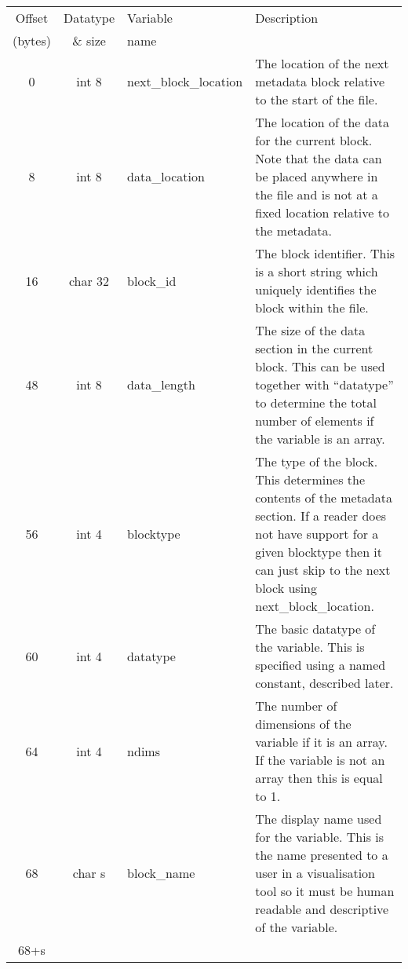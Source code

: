 \documentclass[12pt]{article}
\begin{document}
\begin{center}
\begin{tabularx}{0.9\textwidth}[!hbt]{cclX}
  Offset & Datatype & Variable & Description\\
  (bytes) & \& size & name &
  \\\toprule

  0 & int 8 & next\_block\_location & The location of the next metadata
  block relative to the start of the file.
  \\\midrule

  8 & int 8 & data\_location & The location of the data for the current block.
  Note that the data can be placed anywhere in the file and is not at a fixed
  location relative to the metadata.
  \\\midrule

  16 & char 32 & block\_id & The block identifier. This is a short string
  which uniquely identifies the block within the file.
  \\\midrule

  48 & int 8 & data\_length & The size of the data section in the current block.
  This can be used together with ``datatype'' to determine the total number
  of elements if the variable is an array.
  \\\midrule

  56 & int 4 & blocktype & The type of the block. This determines the contents
  of the metadata section. If a reader does not have support for a given
  blocktype then it can just skip to the next block using next\_block\_location.
  \\\midrule

  60 & int 4 & datatype & The basic datatype of the variable. This is
  specified using a named constant, described later.
  \\\midrule

  64 & int 4 & ndims & The number of dimensions of the variable if
  it is an array. If the variable is not an array then this is equal to 1.
  \\\midrule

  68 & char s & block\_name & The display name used for the variable. This
  is the name presented to a user in a visualisation tool so it must be
  human readable and descriptive of the variable.
  \\\midrule

  68+s &
\end{tabularx}
\end{center}\vspace{10pt}
\end{document}
